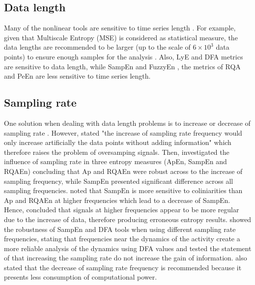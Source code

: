 \subsection{Data length}
Many of the nonlinear tools are sensitive to time series length 
\citep{caballero2014}.
For example, given that Multiscale Entropy (MSE) is considered as 
statistical measure, the data lengths are recommended to be larger 
(up to the scale of $6 \times 10^3$ data points) to ensure 
enough samples for the analysis \citep{costa2007}. 
Also, LyE \citep{wolf1985} and  DFA \citep{peng1995} metrics are sensitive 
to data length, while SampEn \citep{rhea2011} and FuzzyEn 
\citep{richman2000, chen2007}, 
the metrics of RQA \citep{webber1994, riley1999, wijnants2009}
and PeEn \citep{zunino2009} 
are less sensitive to time series length.

\subsection{Sampling rate}
One solution when dealing with data length problems is to increase 
or decrease of sampling rate \citep{caballero2014}.
However, \citealt[p. 267]{duarte2008} stated "the increase of sampling rate 
frequency would only increase artificially the data points without 
adding information" which therefore raises the problem of 
oversamping signals. 
Then, \cite{rhea2011} investigated the influence of sampling rate in 
three entropy measures (ApEn, SampEn and RQAEn) concluding that
Ap and RQAEn were robust across to the increase of sampling frequency,
while SampEn presented significant difference across all sampling 
frequencies. \cite{rhea2011} noted that SampEn is more sensitive to 
coliniarities than Ap and RQAEn at higher frequencies which lead to a 
decrease of SampEn. Hence, \cite{rhea2011} concluded that signals at 
higher frequencies appear to be more regular due to the increase of data, 
therefore producing erroneous entropy results.
\cite{caballero2013} showed the robustness of SampEn and DFA tools
when using different sampling rate frequencies, stating that frequencies 
near the dynamics of the activity create a more reliable analysis of the 
dynamics using DFA values and tested the statement of \cite{duarte2008} 
that increasing the sampling rate do not increase the gain of information.
\cite{caballero2013} also stated that the decrease of sampling 
rate frequency is recommended because it presents less consumption 
of computational power.






